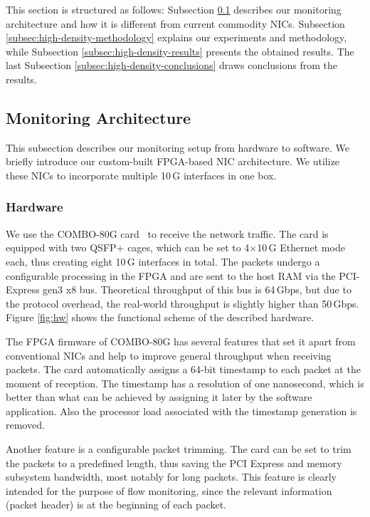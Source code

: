 This section is structured as follows: Subsection \ref{subsec:high-density-monitoring-architecture} describes our monitoring architecture and how it is different from current commodity NICs. Subsection \ref{subsec:high-density-methodology} explains our experiments and methodology, while Subsection \ref{subsec:high-density-results} presents the obtained results. The last Subsection \ref{subsec:high-density-conclusions} draws conclusions from the results.

\subsection{Monitoring Architecture} \label{subsec:high-density-monitoring-architecture}

This subsection describes our monitoring setup from hardware to software. We briefly introduce our custom-built FPGA-based NIC architecture. We utilize these NICs to incorporate multiple 10\,G interfaces in one box.

\subsubsection{Hardware}

We use the COMBO-80G card~\cite{Liberouter--COMBO} to receive the network traffic. The card is equipped with two QSFP+ cages, which can be set to 4$\times$10\,G Ethernet mode each, thus creating eight 10\,G interfaces in total. The packets undergo a configurable processing in the FPGA and are sent to the host RAM via the PCI-Express gen3 x8 bus. Theoretical throughput of this bus is 64\,Gbps, but due to the protocol overhead, the real-world throughput is slightly higher than 50\,Gbps. Figure \ref{fig:hw} shows the functional scheme of the described hardware.

The FPGA firmware of COMBO-80G has several features that set it apart from conventional NICs and help to improve general throughput when receiving packets. The card automatically assigns a 64-bit timestamp to each packet at the moment of reception. The timestamp has a resolution of one nanosecond, which is better than what can be achieved by assigning it later by the software application. Also the processor load associated with the timestamp generation is removed.

Another feature is a configurable packet trimming. The card can be set to trim the packets to a predefined length, thus saving the PCI Express and memory subsystem bandwidth, most notably for long packets. This feature is clearly intended for the purpose of flow monitoring, since the relevant information (packet header) is at the beginning of each packet.

